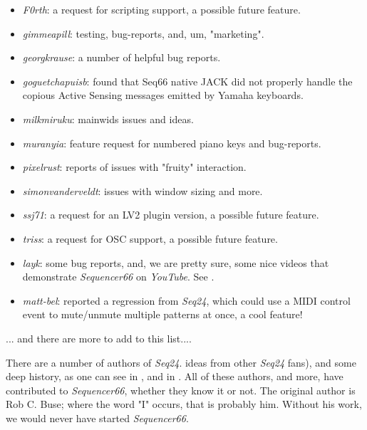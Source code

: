    \begin{itemize}
      \item \textsl{F0rth}:
         a request for scripting support, a possible future feature.
      \item \textsl{gimmeapill}:
         testing, bug-reports, and, um, "marketing".
      \item \textsl{georgkrause}:
         a number of helpful bug reports.
      \item \textsl{goguetchapuisb}:
         found that Seq66 native JACK did not properly handle the copious
         Active Sensing messages emitted by Yamaha keyboards.
      \item \textsl{milkmiruku}:
         mainwids issues and ideas.
      \item \textsl{muranyia}:
         feature request for numbered piano keys and bug-reports.
      \item \textsl{pixelrust}:
         reports of issues with "fruity" interaction.
      \item \textsl{simonvanderveldt}:
         issues with window sizing and more.
      \item \textsl{ssj71}:
         a request for an LV2 plugin version, a possible future feature.
      \item \textsl{triss}:
         a request for OSC support, a possible future feature.
      \item \textsl{layk}:
         some bug reports, and, we are pretty sure, some nice videos that
         demonstrate \textsl{Sequencer66} on \textsl{YouTube}.  See
         \cite{layk}.
      \item \textsl{matt-bel}:
         reported a regression from \textsl{Seq24}, which could use
         a MIDI control event to mute/unmute multiple patterns at once,
         a cool feature!
         
   \end{itemize}

   ... and there are more to add to this list....

   There are a number of authors of \textsl{Seq24}.
   ideas from other \textsl{Seq24} fans),
   and some deep history,
   as one can see in ,
   and in .
   All of these authors, and more, have contributed to \textsl{Sequencer66},
   whether they know it or not.
   The original author is Rob C. Buse; where the word "I" occurs, that is
   probably him.  Without his work, we would never have started
   \textsl{Sequencer66}.

